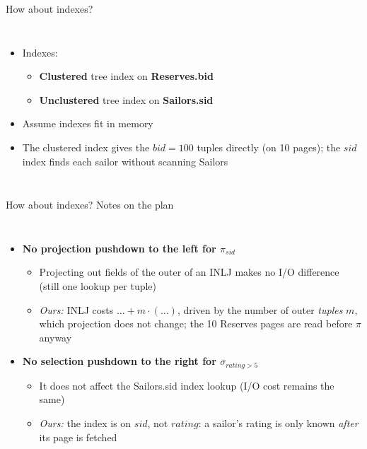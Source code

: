\begin{frame}{How about indexes? }
  \begin{columns}[c]
      \begin{itemize}
        : $\text{cost(outer access)} + |\text{outer}| \cdot \text{cost(one lookup)}$
        \item Indexes:
        \begin{itemize}
          \item \textbf{Clustered} tree index on \textbf{Reserves.bid}
          \item \textbf{Unclustered} tree index on \textbf{Sailors.sid}
        \end{itemize}
        \item Assume indexes fit in memory
        \item The clustered index gives the $\mathit{bid}=100$ tuples directly (on 10 pages);
              the $\mathit{sid}$ index finds each sailor without scanning Sailors
      \end{itemize}
      \planbox[hl]{56mm}{\PlanTen}
  \end{columns}
\end{frame}

\begin{frame}{How about indexes? Notes on the plan }
  \begin{columns}[c]
      \begin{itemize}\footnotesize
        \item \textbf{No projection pushdown to the left for $\pi_{\mathit{sid}}$}
        \begin{itemize}
          \item Projecting out fields of the outer of an INLJ makes no I/O difference (still one lookup per tuple)
          \item \emph{Ours:} INLJ costs $\ldots + m \cdot (\ldots)$, driven by the number of outer \emph{tuples} $m$,
                which projection does not change; the 10 Reserves pages are read before $\pi$ anyway
        \end{itemize}
        \item \textbf{No selection pushdown to the right for $\sigma_{\mathit{rating}>5}$}
        \begin{itemize}
          \item It does not affect the Sailors.sid index lookup (I/O cost remains the same)
          \item \emph{Ours:} the index is on $\mathit{sid}$, not $\mathit{rating}$: a sailor's rating is only
                known \emph{after} its page is fetched
        \end{itemize}
      \end{itemize}
      \planbox[hl]{52mm}{\PlanTen}
  \end{columns}
\end{frame}

